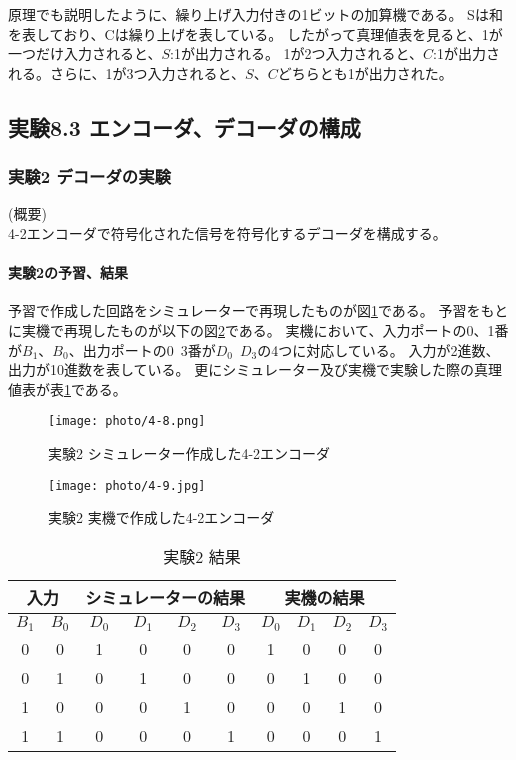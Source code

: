 \documentclass[dvipdfmx]{jsarticle}
\begin{document}
原理でも説明したように、繰り上げ入力付きの1ビットの加算機である。
Sは和を表しており、Cは繰り上げを表している。
したがって真理値表を見ると、1が一つだけ入力されると、$S$:1が出力される。
1が2つ入力されると、$C$:1が出力される。さらに、1が3つ入力されると、$S$、$C$どちらとも1が出力された。

\subsection{実験8.3 エンコーダ、デコーダの構成}

\subsubsection{実験2 デコーダの実験}
(概要)\\
4-2エンコーダで符号化された信号を符号化するデコーダを構成する。

\paragraph{実験2の予習、結果}
予習で作成した回路をシミュレーターで再現したものが図\ref{fig:4-8}である。
予習をもとに実機で再現したものが以下の図\ref{fig:4-9}である。
実機において、入力ポートの0、1番が$B_1$、$B_0$、出力ポートの0~3番が$D_0$~$D_3$の4つに対応している。
入力が2進数、出力が10進数を表している。
更にシミュレーター及び実機で実験した際の真理値表が表\ref{tb:4-5}である。\\

\begin{figure}[hbtp]
  \begin{center}
    \texttt{[image: photo/4-8.png]}
  \end{center}
  \caption{実験2 シミュレーター作成した4-2エンコーダ}
  \label{fig:4-8}
\end{figure}

\begin{figure}[hbtp]
  \begin{center}
    \texttt{[image: photo/4-9.jpg]}
  \end{center}
  \caption{実験2 実機で作成した4-2エンコーダ}
  \label{fig:4-9}
\end{figure}

\begin{table}[hbtp]
  \caption{実験2 結果}
  \centering
  \begin{tabular}{|c|c||c|c|c|c||c|c|c|c|} \hline
    \multicolumn{2}{|c||}{入力} & \multicolumn{4}{c||}{シミュレーターの結果} & \multicolumn{4}{c|}{実機の結果}\\ \hline
    $B_1$ & $B_0$ & $D_0$ & $D_1$ & $D_2$ & $D_3$ & $D_0$ & $D_1$& $D_2$ & $D_3$ \\ \hline
    0 & 0 & 1 & 0 & 0 & 0 & 1 & 0 & 0 & 0 \\ \hline
    0 & 1 & 0 & 1 & 0 & 0 & 0 & 1 & 0 & 0 \\ \hline
    1 & 0 & 0 & 0 & 1 & 0 & 0 & 0 & 1 & 0 \\ \hline
    1 & 1 & 0 & 0 & 0 & 1 & 0 & 0 & 0 & 1 \\ \hline
  \end{tabular}
  \label{tb:4-5}
\end{table}
\end{document}
